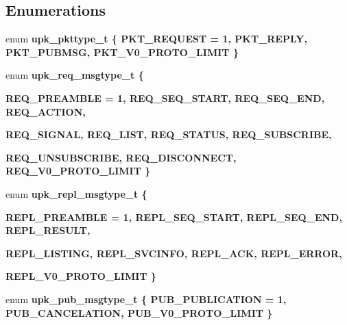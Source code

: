 \subsection*{Enumerations}
\begin{CompactItemize}
\item 
enum \bf{upk\_\-pkttype\_\-t} \{ \bf{PKT\_\-REQUEST} =  1, 
\bf{PKT\_\-REPLY}, 
\bf{PKT\_\-PUBMSG}, 
\bf{PKT\_\-V0\_\-PROTO\_\-LIMIT}
 \}
\item 
enum \bf{upk\_\-req\_\-msgtype\_\-t} \{ \par
\bf{REQ\_\-PREAMBLE} =  1, 
\bf{REQ\_\-SEQ\_\-START}, 
\bf{REQ\_\-SEQ\_\-END}, 
\bf{REQ\_\-ACTION}, 
\par
\bf{REQ\_\-SIGNAL}, 
\bf{REQ\_\-LIST}, 
\bf{REQ\_\-STATUS}, 
\bf{REQ\_\-SUBSCRIBE}, 
\par
\bf{REQ\_\-UNSUBSCRIBE}, 
\bf{REQ\_\-DISCONNECT}, 
\bf{REQ\_\-V0\_\-PROTO\_\-LIMIT}
 \}
\item 
enum \bf{upk\_\-repl\_\-msgtype\_\-t} \{ \par
\bf{REPL\_\-PREAMBLE} =  1, 
\bf{REPL\_\-SEQ\_\-START}, 
\bf{REPL\_\-SEQ\_\-END}, 
\bf{REPL\_\-RESULT}, 
\par
\bf{REPL\_\-LISTING}, 
\bf{REPL\_\-SVCINFO}, 
\bf{REPL\_\-ACK}, 
\bf{REPL\_\-ERROR}, 
\par
\bf{REPL\_\-V0\_\-PROTO\_\-LIMIT}
 \}
\item 
enum \bf{upk\_\-pub\_\-msgtype\_\-t} \{ \bf{PUB\_\-PUBLICATION} =  1, 
\bf{PUB\_\-CANCELATION}, 
\bf{PUB\_\-V0\_\-PROTO\_\-LIMIT}
 \}
\end{CompactItemize}
